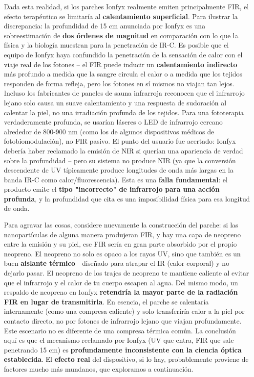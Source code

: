 \documentclass{article}
\begin{document}
Dada esta realidad, si los parches Ionfyx realmente emiten principalmente FIR, el efecto terapéutico se limitaría al \textbf{calentamiento superficial}. Para ilustrar la discrepancia: la profundidad de 15 cm anunciada por Ionfyx es una sobreestimación de \textbf{dos órdenes de magnitud} en comparación con lo que la física y la biología muestran para la penetración de IR-C. Es posible que el equipo de Ionfyx haya confundido la penetración de la sensación de calor con el viaje real de los fotones – el FIR puede inducir un \textbf{calentamiento indirecto} más profundo a medida que la sangre circula el calor o a medida que los tejidos responden de forma refleja, pero los fotones en sí mismos no viajan tan lejos. Incluso los fabricantes de paneles de sauna infrarroja reconocen que el infrarrojo lejano solo causa un suave calentamiento y una respuesta de sudoración al calentar la piel, no una irradiación profunda de los tejidos. Para una fototerapia verdaderamente profunda, se usarían láseres o LED de infrarrojo cercano alrededor de 800-900 nm (como los de algunos dispositivos médicos de fotobiomodulación), no FIR pasivo. El punto del usuario fue acertado: Ionfyx debería haber reclamado la emisión de NIR si querían una apariencia de verdad sobre la profundidad – pero su sistema no produce NIR (ya que la conversión descendente de UV típicamente produce longitudes de onda más largas en la banda IR-C como calor/fluorescencia). Esta es una \textbf{falla fundamental}: el producto emite el \textbf{tipo "incorrecto" de infrarrojo para una acción profunda}, y la profundidad que cita es una imposibilidad física para esa longitud de onda.

Para agravar las cosas, considere nuevamente la construcción del parche: si las nanopartículas de alguna manera produjeran FIR, y hay una capa de neopreno entre la emisión y su piel, ese FIR sería en gran parte absorbido por el propio neopreno. El neopreno no solo es opaco a los rayos UV, sino que también es un buen \textbf{aislante térmico} - diseñado para atrapar el IR (calor corporal) y no dejarlo pasar. El neopreno de los trajes de neopreno te mantiene caliente al evitar que el infrarrojo y el calor de tu cuerpo escapen al agua. Del mismo modo, un respaldo de neopreno en Ionfyx \textbf{retendría la mayor parte de la radiación FIR en lugar de transmitirla}. En esencia, el parche se calentaría internamente (como una compresa caliente) y solo transferiría calor a la piel por contacto directo, no por fotones de infrarrojo lejano que viajan profundamente. Este escenario no es diferente de una compresa térmica común. La conclusión aquí es que el mecanismo reclamado por Ionfyx (UV que entra, FIR que sale penetrando 15 cm) es \textbf{profundamente inconsistente con la ciencia óptica establecida}. El \textbf{efecto real} del dispositivo, si lo hay, probablemente proviene de factores mucho más mundanos, que exploramos a continuación.
\end{document}
